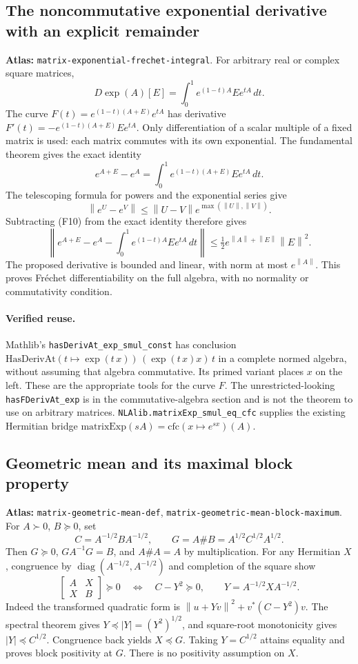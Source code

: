 \documentclass[11pt,a4paper]{article}
\newcommand{\norm}[1]{\left\lVert#1\right\rVert}
\DeclareMathOperator{\diag}{diag}
\DeclareRobustCommand{\code}[1]{{\footnotesize\urlstyle{tt}\nolinkurl{#1}}}
\begin{document}
\subsection{The noncommutative exponential derivative with an explicit remainder}
\label{sec:matrix-exponential-frechet-integral}
\textbf{Atlas:} \code{matrix-exponential-frechet-integral}.
For arbitrary real or complex square matrices,
\[
 D\exp(A)[E]=\int_0^1e^{(1-t)A}Ee^{tA}\,dt.                    \tag{F10}
\]
The curve $F(t)=e^{(1-t)(A+E)}e^{tA}$ has derivative
$F'(t)=-e^{(1-t)(A+E)}Ee^{tA}$. Only differentiation of a scalar multiple
of a fixed matrix is used: each matrix commutes with its own exponential.
The fundamental theorem gives the exact identity
\[
 e^{A+E}-e^A=\int_0^1e^{(1-t)(A+E)}Ee^{tA}\,dt.
\]
The telescoping formula for powers and the exponential series give
\[
 \norm{e^U-e^V}\le\norm{U-V}e^{\max(\norm U,\norm V)}.
\]
Subtracting (F10) from the exact identity therefore gives
\[
 \left\|e^{A+E}-e^A-\int_0^1e^{(1-t)A}Ee^{tA}\,dt\right\|
 \le\tfrac12 e^{\norm A+\norm E}\norm E^2.                    \tag{F11}
\]
The proposed derivative is bounded and linear, with norm at most
$e^{\norm A}$. This proves Fr\'echet differentiability on the full algebra,
with no normality or commutativity condition.

\paragraph{Verified reuse.}
Mathlib's \code{hasDerivAt_exp_smul_const} has conclusion
$\mathrm{HasDerivAt}(t\mapsto\exp(t\,x))\,(\exp(t\,x)x)\,t$
in a complete normed algebra, without assuming that algebra commutative.
Its primed variant places $x$ on the left. These are the appropriate tools
for the curve $F$. The unrestricted-looking
\code{hasFDerivAt_exp} is in the commutative-algebra section
and is not the theorem to use on arbitrary matrices.
\code{NLAlib.matrixExp_smul_eq_cfc} supplies the existing Hermitian bridge
$\mathrm{matrixExp}(sA)=\mathrm{cfc}(x\mapsto e^{sx})(A)$.

\subsection{Geometric mean and its maximal block property}
\label{sec:matrix-geometric-mean-def}
\textbf{Atlas:} \code{matrix-geometric-mean-def},
\code{matrix-geometric-mean-block-maximum}.
For $A\succ0$, $B\succeq0$, set
\[
 C=A^{-1/2}BA^{-1/2},\qquad G=A\#B=A^{1/2}C^{1/2}A^{1/2}.
\]
Then $G\succeq0$, $GA^{-1}G=B$, and $A\#A=A$ by multiplication.
For any Hermitian $X$, congruence by
\label{sec:matrix-geometric-mean-block-maximum}
$\diag(A^{-1/2},A^{-1/2})$ and completion of the square show
\[
 \begin{bmatrix}A&X\\X&B\end{bmatrix}\succeq0
 \quad\Longleftrightarrow\quad C-Y^2\succeq0,
 \qquad Y=A^{-1/2}XA^{-1/2}.
\]
Indeed the transformed quadratic form is
$\norm{u+Yv}^2+v^*(C-Y^2)v$. The spectral theorem gives
$Y\preceq |Y|=(Y^2)^{1/2}$, and square-root monotonicity gives
$|Y|\preceq C^{1/2}$. Congruence back yields $X\preceq G$.
Taking $Y=C^{1/2}$ attains equality and proves block positivity at $G$.
There is no positivity assumption on $X$.
\end{document}
